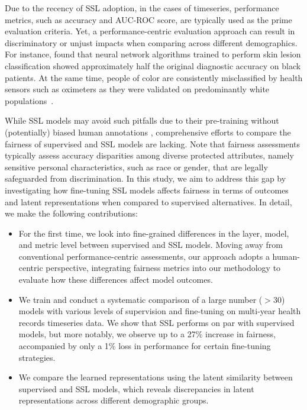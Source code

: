 \documentclass[letterpaper]{article} %
\begin{document}
Due to the recency of SSL adoption, in the cases of timeseries, performance metrics, such as accuracy and AUC-ROC score, are typically used as the prime evaluation criteria. Yet, a performance-centric evaluation approach can result in discriminatory or unjust impacts when comparing across different demographics. For instance, \citet{kamulegeya2019using} found that neural network algorithms trained to perform skin lesion classification showed approximately half the original diagnostic accuracy on black patients. At the same time, people of color are consistently misclassified by health sensors such as oximeters as they were validated on predominantly white populations~\cite{sjoding2020racial}. 

While SSL models may avoid such pitfalls due to their pre-training without (potentially) biased human annotations \cite{ramapuram2021evaluating}, comprehensive efforts to compare the fairness of supervised and SSL models are lacking. Note that fairness assessments typically assess accuracy disparities among diverse protected attributes, namely sensitive personal characteristics, such as race or gender, that are legally safeguarded from discrimination. In this study, we aim to address this gap by investigating how fine-tuning SSL models affects fairness in terms of outcomes and latent representations when compared to supervised alternatives. In detail, we make the following contributions:
\begin{itemize}
    \item For the first time, we look into fine-grained differences in the layer, model, and metric level between supervised and SSL models. Moving away from conventional performance-centric assessments, our approach adopts a human-centric perspective, integrating fairness metrics into our methodology to evaluate how these differences affect model outcomes. 
    
    \item We train and conduct a systematic comparison of a large number ($>$30) models with various levels of supervision and fine-tuning on multi-year health records timeseries data. We show that SSL performs on par with supervised models, but more notably, we observe up to a 27\% increase in fairness, accompanied by only a 1\% loss in performance for certain fine-tuning strategies.
    \item We compare the learned representations using the latent similarity between supervised and SSL models, which reveals discrepancies in latent representations across different demographic groups.
\end{itemize}
\end{document}
